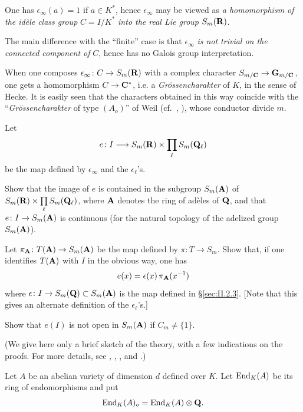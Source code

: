 One has $\epsilon_\infty(a) = 1$ if $a \in K^*$, hence $\epsilon_\infty$
may be viewed as \emph{a homomorphism of the idèle class group}
$C = I/K^*$ \emph{into the real Lie group} $S_m(\mathbf{R})$.

The main difference with the ``finite'' case is that $\epsilon_\infty$
\emph{is not trivial on the connected component of} $C$, hence has no
Galois group interpretation.

When one composes $\epsilon_\infty\colon C \to S_m(\mathbf{R})$ with a complex
character $S_{m/\mathbf{C}} \to \mathbf{G}_{m/\mathbf{C}}$, one gets a homomorphism
$C \to \mathbf{C}^*$, i.e.  a \emph{Grössencharakter} of $K$, in the sense of
Hecke.  It is easily seen that the characters obtained in this way
coincide with the ``\emph{Grössencharakter} of type $(A_o)$'' of Weil
(cf.~\cite{taniyama}, \cite{weil-characters}), whose conductor divide
$m$.


Let
\[
e\colon I \longrightarrow S_m(\mathbf{R}) \times \prod_\ell S_m(\mathbf{Q}_\ell)
\]
be the map defined by $\epsilon_\infty$ and the $\epsilon_\ell$'s.

\begin{alist}[label=\alph*)]
\item Show that the image of $e$ is contained in the subgroup
$S_m(\mathbf{A})$ of $S_m(\mathbf{R}) \times \prod\limits_\ell S_m(\mathbf{Q}_\ell)$, where
$\mathbf{A}$ denotes the ring of adèles of $\mathbf{Q}$, and that
$e\colon I \to S_m(\mathbf{A})$ is continuous (for the natural topology of the
adelized group $S_m(\mathbf{A})$).
\item Let $\pi_{\mathbf{A}}\colon T(\mathbf{A}) \to S_m(\mathbf{A})$ be the map defined by
$\pi\colon T \to S_m$.  Show that, if one identifies $T(\mathbf{A})$ with $I$
in the obvious way, one has
\[
e(x) = \epsilon(x)\,\pi_{\mathbf{A}}(x^{-1})
\]
where $\epsilon\colon I \to S_m(\mathbf{Q}) \subset S_m(\mathbf{A})$ is the map defined
in \S\ref{sec:II.2.3}.  [Note that this gives an alternate definition
of the $\epsilon_\ell$'s.]
\item Show that $e(I)$ is not open in $S_m(\mathbf{A})$ if $C_m \neq \{1\}$.
\end{alist}


(We give here only a brief sketch of the theory, with a few indications
on the proofs.  For more details, see \cite{shimura-taniyama},
\cite{taniyama}, \cite{weil-characters}, \cite{weil-cm} and
\cite{serre-tate-good}.)

Let $A$ be an abelian variety of dimension $d$ defined over $K$.  Let
$\mathrm{End}_K(A)$ be its ring of endomorphisms and put
\[
\mathrm{End}_K(A)_o = \mathrm{End}_K(A) \mathbin{\otimes} \mathbf{Q}.
\]

